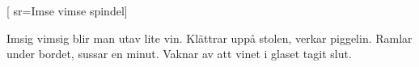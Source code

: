 

[					%
	sr={Imse vimse spindel}]						%
	

\beginverse*						%
Imsig vimsig blir man
utav lite vin.
Klättrar uppå stolen,
verkar piggelin.
Ramlar under bordet,
sussar en minut.
Vaknar av att vinet
i glaset tagit slut.
\endverse							%

\endsong							%